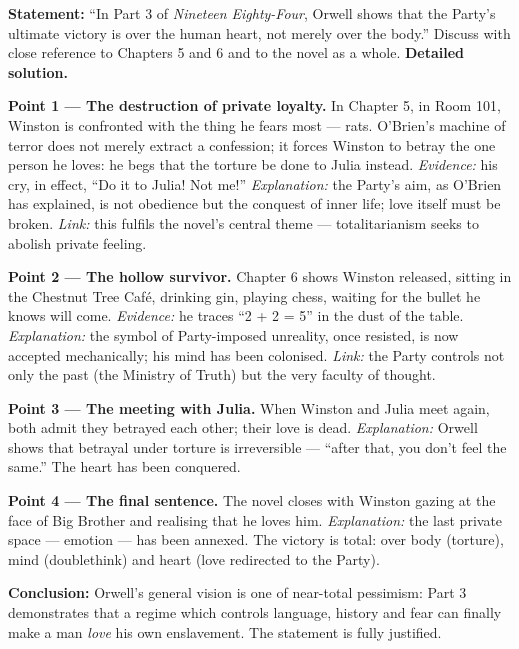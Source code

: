 \documentclass[11pt]{article}
\begin{document}
\begin{exoresolu}
\textbf{Statement:} ``In Part 3 of \emph{Nineteen Eighty-Four}, Orwell shows that the Party's ultimate victory is over the human heart, not merely over the body.'' Discuss with close reference to Chapters 5 and 6 and to the novel as a whole.
\tcblower
\textbf{Detailed solution.}

\textbf{Point 1 — The destruction of private loyalty.} In Chapter 5, in Room 101, Winston is confronted with the thing he fears most — rats. O'Brien's machine of terror does not merely extract a confession; it forces Winston to betray the one person he loves: he begs that the torture be done to Julia instead. \emph{Evidence:} his cry, in effect, ``Do it to Julia! Not me!'' \emph{Explanation:} the Party's aim, as O'Brien has explained, is not obedience but the conquest of inner life; love itself must be broken. \emph{Link:} this fulfils the novel's central theme — totalitarianism seeks to abolish private feeling.

\textbf{Point 2 — The hollow survivor.} Chapter 6 shows Winston released, sitting in the Chestnut Tree Café, drinking gin, playing chess, waiting for the bullet he knows will come. \emph{Evidence:} he traces ``2 + 2 = 5'' in the dust of the table. \emph{Explanation:} the symbol of Party-imposed unreality, once resisted, is now accepted mechanically; his mind has been colonised. \emph{Link:} the Party controls not only the past (the Ministry of Truth) but the very faculty of thought.

\textbf{Point 3 — The meeting with Julia.} When Winston and Julia meet again, both admit they betrayed each other; their love is dead. \emph{Explanation:} Orwell shows that betrayal under torture is irreversible — ``after that, you don't feel the same.'' The heart has been conquered.

\textbf{Point 4 — The final sentence.} The novel closes with Winston gazing at the face of Big Brother and realising that he loves him. \emph{Explanation:} the last private space — emotion — has been annexed. The victory is total: over body (torture), mind (doublethink) and heart (love redirected to the Party).

\textbf{Conclusion:} Orwell's general vision is one of near-total pessimism: Part 3 demonstrates that a regime which controls language, history and fear can finally make a man \emph{love} his own enslavement. The statement is fully justified.
\end{exoresolu}
\end{document}
